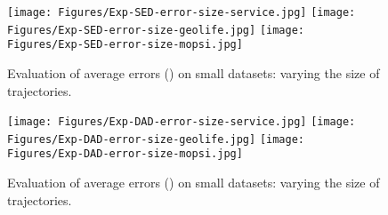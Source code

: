 \begin{figure*}[tb!]
	\centering
	\texttt{[image: Figures/Exp-SED-error-size-service.jpg]} 	\hspace{0.5ex}
	\texttt{[image: Figures/Exp-SED-error-size-geolife.jpg]}	\hspace{0.5ex}
	\texttt{[image: Figures/Exp-SED-error-size-mopsi.jpg]}		
	\vspace{-2ex}
	\caption{\small Evaluation of average errors (\sed) on small datasets: varying the size of
		trajectories.}
	\label{fig:ae-sed-size}
	\vspace{-2ex}
\end{figure*}


\begin{figure*}[tb!]
	\centering
	\texttt{[image: Figures/Exp-DAD-error-size-service.jpg]}	\hspace{0.5ex}
	\texttt{[image: Figures/Exp-DAD-error-size-geolife.jpg]}	\hspace{0.5ex}
	\texttt{[image: Figures/Exp-DAD-error-size-mopsi.jpg]}	
	\vspace{-2ex}
	\caption{\small Evaluation of average errors (\dad) on small datasets: varying the size of trajectories.}
	\label{fig:ae-dad-size}
	\vspace{-2ex}
\end{figure*}



